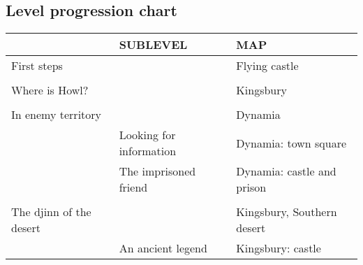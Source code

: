\subsection{Level progression chart}

\begin{table}[H]
\begin{tabular}{|lll|}
\hline
\rowcolor[HTML]{C0C0C0} 
\multicolumn{1}{|l|}{\cellcolor[HTML]{C0C0C0}\textbf{LEVEL}} & \multicolumn{1}{l|}{\cellcolor[HTML]{C0C0C0}\textbf{SUBLEVEL}} & \textbf{MAP}                \\ \hline
\multicolumn{1}{|l|}{First steps}                            & \multicolumn{1}{l|}{}                                          & Flying castle               \\ \hline
                                                             &                                                                &                             \\ \hline
\multicolumn{1}{|l|}{Where is Howl?}                         & \multicolumn{1}{l|}{}                                          & Kingsbury                   \\ \hline
                                                             &                                                                &                             \\ \hline
\multicolumn{1}{|l|}{In enemy territory}                     & \multicolumn{1}{l|}{}                                          & Dynamia                     \\ \hline
\multicolumn{1}{|l|}{}                                       & \multicolumn{1}{l|}{Looking for information}                   & Dynamia: town square        \\ \hline
\multicolumn{1}{|l|}{}                                       & \multicolumn{1}{l|}{The imprisoned friend}                     & Dynamia: castle and prison  \\ \hline
                                                             &                                                                &                             \\ \hline
\multicolumn{1}{|l|}{The djinn of the desert}                & \multicolumn{1}{l|}{}                                          & Kingsbury, Southern desert  \\ \hline
\multicolumn{1}{|l|}{}                                       & \multicolumn{1}{l|}{An ancient legend}                         & Kingsbury: castle           \\ \hline

\end{tabular}
\end{table}
